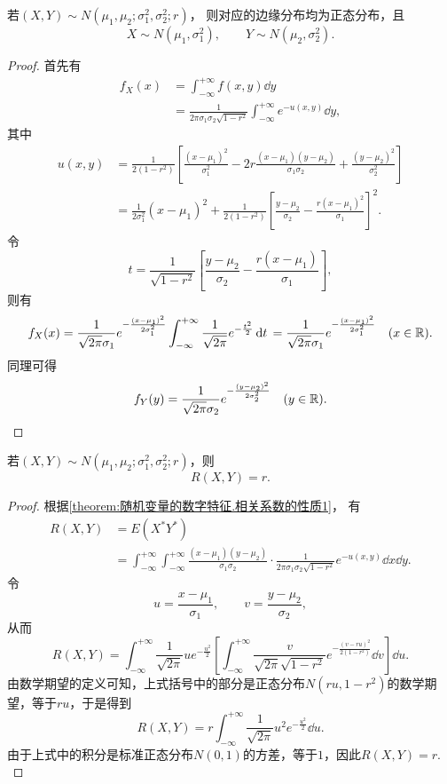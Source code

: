 \begin{theorem}\label{theorem:正态分布与自然指数分布族.性质1}
若\((X,Y) \sim N(\mu_1,\mu_2;\sigma_1^2,\sigma_2^2;r)\)，
则对应的边缘分布均为正态分布，且\[
	X \sim N(\mu_1,\sigma_1^2),
	\qquad
	Y \sim N(\mu_2,\sigma_2^2).
\]
\begin{proof}
首先有\begin{align*}
	f_X(x) &= \int_{-\infty}^{+\infty} f(x,y) \dd{y} \\
	&= \frac{1}{2\pi\sigma_1\sigma_2\sqrt{1-r^2}}
		\int_{-\infty}^{+\infty} e^{-u(x,y)} \dd{y},
\end{align*}
其中\begin{align*}
	u(x,y)
	&= \frac{1}{2(1-r^2)} \left[
			\frac{(x-\mu_1)^2}{\sigma_1^2}
			-2r\frac{(x-\mu_1)(y-\mu_2)}{\sigma_1\sigma_2}
			+\frac{(y-\mu_2)^2}{\sigma_2^2}
		\right] \\
	&= \frac{1}{2 \sigma_1^2} (x-\mu_1)^2
		+ \frac{1}{2(1-r^2)} \left[
			\frac{y-\mu_2}{\sigma_2}
			- \frac{r(x-\mu_1)^2}{\sigma_1}
		\right]^2.
\end{align*}
令\[
t = \frac{1}{\sqrt{1-r^2}} \left[
\frac{y-\mu_2}{\sigma_2}
- \frac{r(x-\mu_1)}{\sigma_1}
\right],
\]则有\[
f_X(x)
= \frac{1}{\sqrt{2\pi} \sigma_1} e^{-\frac{(x-\mu_1)^2}{2\sigma_1^2}} \int_{-\infty}^{+\infty} \frac{1}{\sqrt{2\pi}} e^{-\frac{t^2}{2}} \dd{t} \\
= \frac{1}{\sqrt{2\pi} \sigma_1} e^{-\frac{(x-\mu_1)^2}{2\sigma_1^2}}
\quad(x\in\mathbb{R}).
\]
同理可得\[
f_Y(y)
= \frac{1}{\sqrt{2\pi} \sigma_2} e^{-\frac{(y-\mu_2)^2}{2\sigma_2^2}}
\quad(y\in\mathbb{R}).
\qedhere
\]
\end{proof}
\end{theorem}

\begin{theorem}\label{theorem:正态分布与自然指数分布族.性质2}
若\((X,Y) \sim N(\mu_1,\mu_2;\sigma_1^2,\sigma_2^2;r)\)，则\[
R(X,Y) = r.
\]
\begin{proof}
根据\cref{theorem:随机变量的数字特征.相关系数的性质1}，
有\begin{align*}
	R(X,Y)
	&= E(X^* Y^*) \\
	&= \int_{-\infty}^{+\infty} \int_{-\infty}^{+\infty}
		\frac{(x-\mu_1)(y-\mu_2)}{\sigma_1 \sigma_2}
		\cdot
		\frac{1}{2\pi \sigma_1 \sigma_2 \sqrt{1-r^2}}
		e^{-u(x,y)}
		\dd{x} \dd{y}.
\end{align*}
{%
\def\u{u}%
\def\v{v}%
\def\intx{\int_{-\infty}^{+\infty}}%
令\[
	\u = \frac{x-\mu_1}{\sigma_1},
	\qquad
	\v = \frac{y-\mu_2}{\sigma_2},
\]从而\[
	R(X,Y)
	= \intx
		\frac{1}{\sqrt{2\pi}}
		\u e^{-\frac{\u^2}{2}}
		\left[
			\intx
			\frac{\v}{\sqrt{2\pi} \sqrt{1-r^2}}
			e^{-\frac{(\v-r\u)^2}{2(1-r^2)}}
			\dd{\v}
		\right]
		\dd{\u}.
\]
由数学期望的定义可知，上式括号中的部分是正态分布\(N(r\u,1-r^2)\)的数学期望，等于\(r\u\)，于是得到\[
	R(X,Y)
	= r \intx \frac{1}{\sqrt{2\pi}} \u^2 e^{-\frac{\u^2}{2}} \dd{\u}.
\]
由于上式中的积分是标准正态分布\(N(0,1)\)的方差，等于\(1\)，因此\(R(X,Y) = r\).
}%
\end{proof}
\end{theorem}

